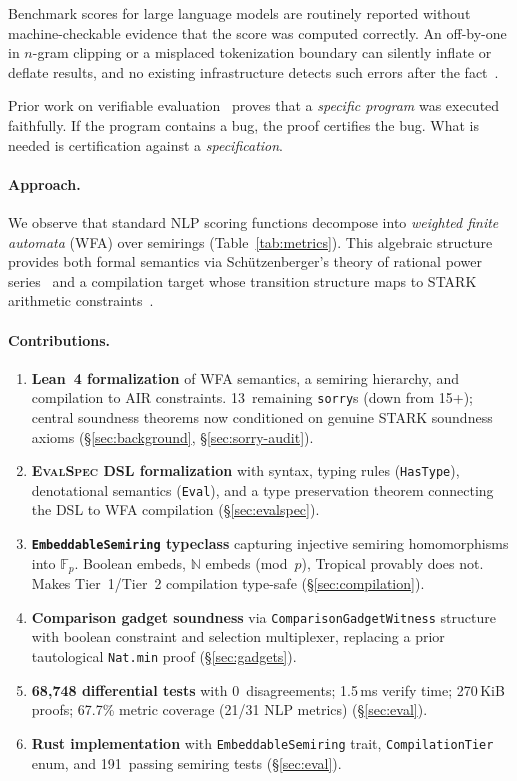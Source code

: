 \documentclass[11pt]{article}
\newcommand{\evalspec}{\textsc{EvalSpec}}
\newcommand{\N}{\mathbb{N}}
\newcommand{\F}{\mathbb{F}}
\newcommand{\sorry}{\texttt{sorry}}
\begin{document}
Benchmark scores for large language models are routinely reported without
machine-checkable evidence that the score was computed correctly.
An off-by-one in $n$-gram clipping or a misplaced tokenization boundary
can silently inflate or deflate results, and no existing infrastructure
detects such errors after the fact~\cite{post2018bleu}.

Prior work on verifiable evaluation~\cite{south2024verifiableevals}
proves that a \emph{specific program} was executed faithfully.
If the program contains a bug, the proof certifies the bug.
What is needed is certification against a \emph{specification}.

\paragraph{Approach.}
We observe that standard NLP scoring functions decompose into
\emph{weighted finite automata} (WFA) over semirings
(Table~\ref{tab:metrics}).
This algebraic structure provides both formal semantics via
Sch\"utzenberger's theory of rational power
series~\cite{schutzenberger1961,droste2009handbook} and a compilation
target whose transition structure maps to STARK arithmetic
constraints~\cite{bensasson2018stark}.

\paragraph{Contributions.}
\begin{enumerate}[leftmargin=*,nosep]
\item \textbf{Lean~4 formalization} of WFA semantics, a semiring
  hierarchy, and compilation to AIR constraints.
  13~remaining \sorry{}s (down from 15+); central soundness theorems
  now conditioned on genuine STARK soundness axioms
  (\S\ref{sec:background}, \S\ref{sec:sorry-audit}).
\item \textbf{\evalspec{} DSL formalization} with syntax, typing
  rules (\texttt{HasType}), denotational semantics (\texttt{Eval}),
  and a type preservation theorem connecting the DSL to WFA
  compilation (\S\ref{sec:evalspec}).
\item \textbf{\texttt{EmbeddableSemiring} typeclass} capturing
  injective semiring homomorphisms into $\F_p$.
  Boolean embeds, $\N$ embeds (mod~$p$), Tropical provably does not.
  Makes Tier~1/Tier~2 compilation type-safe (\S\ref{sec:compilation}).
\item \textbf{Comparison gadget soundness} via
  \texttt{ComparisonGadgetWitness} structure with boolean constraint
  and selection multiplexer, replacing a prior tautological
  \texttt{Nat.min} proof (\S\ref{sec:gadgets}).
\item \textbf{68{,}748 differential tests} with 0~disagreements;
  1.5\,ms verify time; 270\,KiB proofs; 67.7\% metric coverage
  (21/31 NLP metrics) (\S\ref{sec:eval}).
\item \textbf{Rust implementation} with \texttt{EmbeddableSemiring}
  trait, \texttt{CompilationTier} enum, and 191~passing semiring
  tests (\S\ref{sec:eval}).
\end{enumerate}
\end{document}
